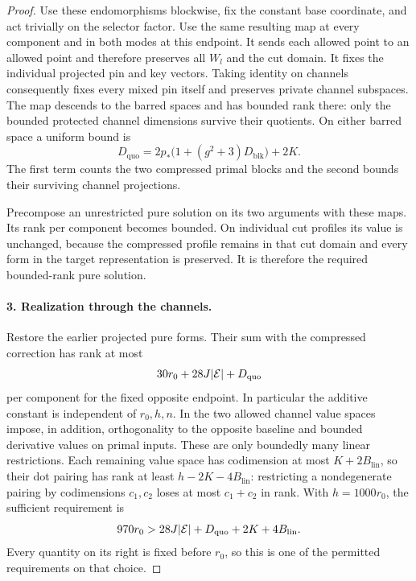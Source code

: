 \begin{proof}
Use these endomorphisms blockwise, fix the constant base
coordinate, and act trivially on the selector factor.  Use
the same resulting map at every component and in both modes
at this endpoint.  It sends each allowed point to an allowed
point and therefore preserves all $W_l$ and the cut domain.
It fixes the individual projected pin and key vectors.
Taking identity on channels consequently fixes every mixed
pin itself and preserves private channel subspaces.  The
map descends to the barred spaces and has bounded rank there:
only the bounded protected channel dimensions survive their
quotients.  On either barred space a uniform bound is
\begin{equation}\label{eq:quotient-compression-bound}
 D_{\mathrm{quo}}
 =2p_*\bigl(1+(g^2+3)D_{\mathrm{blk}}\bigr)+2K.
\end{equation}
The first term counts the two compressed primal blocks and
the second bounds their surviving channel projections.

Precompose an unrestricted pure solution on its two arguments
with these maps.  Its rank per component becomes bounded.
On individual cut profiles its value is unchanged, because
the compressed profile remains in that cut domain and every
form in the target representation is preserved.  It is
therefore the required bounded-rank pure solution.

\paragraph{3. Realization through the channels.}
Restore the earlier projected pure forms.  Their sum with
the compressed correction has rank at most
\begin{equation}\label{eq:final-pure-rank}
 30r_0+28J|\mathcal E|+D_{\mathrm{quo}}
\end{equation}
per component for the fixed opposite endpoint.  In particular
the additive constant is independent of $r_0,h,n$.
In the two allowed channel value spaces impose, in addition,
orthogonality to the opposite baseline and bounded derivative
values on primal inputs.  These are only boundedly many
linear restrictions.  Each remaining value space has
codimension at most $K+2B_{\mathrm{lin}}$, so their dot pairing
has rank at least $h-2K-4B_{\mathrm{lin}}$: restricting a
nondegenerate pairing by codimensions $c_1,c_2$ loses at most
$c_1+c_2$ in rank.  With $h=1000r_0$, the sufficient requirement
is
\begin{equation}\label{eq:realization-r0-requirement}
 970r_0>28J|\mathcal E|+D_{\mathrm{quo}}+2K+4B_{\mathrm{lin}}.
\end{equation}
Every quantity on its right is fixed before $r_0$, so this is
one of the permitted requirements on that choice.


\end{proof}
